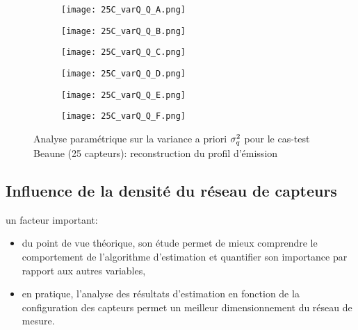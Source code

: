 \begin{figure}[p!]
	\centering
	\begin{subfigure}[t]{0.5\textwidth}
		\centering
		\texttt{[image: 25C\_varQ\_Q\_A.png]}
		\caption{}
		\label{varq_A_q}
	\end{subfigure}%
	\begin{subfigure}[t]{0.5\textwidth}
		\centering
		\texttt{[image: 25C\_varQ\_Q\_B.png]}
		\caption{}
		\label{varq_B_q}
	\end{subfigure}
	\begin{subfigure}[t]{0.5\textwidth}
		\centering
		\texttt{[image: 25C\_varQ\_Q\_C.png]}
		\caption{}
		\label{varq_C_q}
	\end{subfigure}%
	\begin{subfigure}[t]{0.5\textwidth}
		\centering
		\texttt{[image: 25C\_varQ\_Q\_D.png]}
		\caption{}
		\label{varq_D_q}
	\end{subfigure}
	\begin{subfigure}[t]{0.5\textwidth}
		\centering
		\texttt{[image: 25C\_varQ\_Q\_E.png]}
		\caption{}
		\label{varq_E_q}
	\end{subfigure}%
	\begin{subfigure}[t]{0.5\textwidth}
		\centering
		\texttt{[image: 25C\_varQ\_Q\_F.png]}
		\caption{}
		\label{varq_F_q}
	\end{subfigure}
	\caption{Analyse paramétrique sur la variance a priori $\sigma_q^2$ pour le cas-test Beaune (25 capteurs): reconstruction du profil d'émission}
	\label{fig_25C_analyse_varq_q}
\end{figure}



\subsection{Influence de la densité du réseau de capteurs}

 un facteur important: 

\begin{itemize}
	\item du point de vue théorique, son étude permet de mieux comprendre le comportement de l'algorithme d'estimation et quantifier son importance par rapport aux autres variables,
	\item en pratique, l'analyse des résultats d'estimation en fonction de la configuration des capteurs permet un meilleur dimensionnement du réseau de mesure.\\
\end{itemize}

